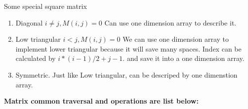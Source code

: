 \documentclass[a4paper,11pt,twoside]{book}
\begin{document}
\par  Some special square matrix
\begin{enumerate}
	\item Diagonal  $i\neq j, M(i,j) = 0$ Can use one dimension array to describe it. 
	
	\item Low triangular $i<j, M(i,j) = 0$ We can use one dimension array to implement lower triangular because it will save many spaces.  Index can be calculated by $i*(i-1)/2+j-1$. and save it into a one dimension array. 
	
	\item Symmetric. Just like Low triangular, can be descriped by one dimenstion array. 
\end{enumerate}

\par \textbf{Matrix common traversal and operations are list below:}
\end{document}

